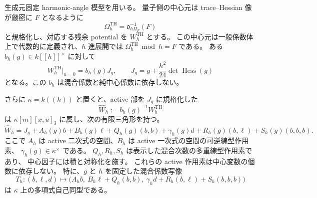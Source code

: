 \begin{proposition}
\label{prop:nfm-residual-mixed-triangular}
生成元固定 harmonic-angle 模型を用いる。
量子側の中心元は trace--Hessian 像が厳密に $F$ となるように
\[
 \Omega^{\mathrm{TH}}_h=\mathfrak d_{h\Pi_F}^{-1}(F)
\]
と規格化し、対応する残余 potential を $W^{\mathrm{TH}}_h$ とする。
この中心元は一般係数体上で代数的に定義され、$h$ 進展開では
$\Omega^{\mathrm{TH}}_h\bmod h=F$ である。
ある $b_h(g)\in k[[h]]^\times$ に対して
\[
 W^{\mathrm{TH}}_h|_{u=0}=b_h(g)J_g,
 \qquad J_g=g+\frac{h^2}{24}\det\operatorname{Hess}(g)
\]
となる。この $b_h$ は混合係数と純中心係数に依存しない。

さらに $\kappa=k((h))$ と置くと、active 部を $J_g$ に規格化した
\[
 \widehat W_h:=b_h(g)^{-1}W^{\mathrm{TH}}_h
\]
は $\kappa[m][x,u]_3$ に属し、次の有限三角形を持つ。
\begin{equation}\label{eq:nfm-residual-mixed-triangular}
 \widehat W_h
 =J_g+A_h(g)b+B_h(g)\ell+Q_h(g)(b,b)
    +\gamma_h(g)d+R_h(g)(b,\ell)+S_h(g)(b,b,b).
\end{equation}
ここで $A_h$ は active 二次式の空間、$B_h$ は active 一次式の空間の可逆線型作用素、
$\gamma_h(g)\in\kappa^\times$ である。
$Q_h,R_h,S_h$ は表示した混合次数の多重線型作用素であり、
中心因子には積と対称化を施す。
これらの active 作用素は中心変数の個数に依存しない。
特に、$g$ と $h$ を固定した混合係数写像
\[
 T_h:(b,\ell,d)\longmapsto
 \bigl(A_hb,\ B_h\ell+Q_h(b,b),\
 \gamma_h d+R_h(b,\ell)+S_h(b,b,b)\bigr)
\]
は $\kappa$ 上の多項式自己同型である。
\end{proposition}

